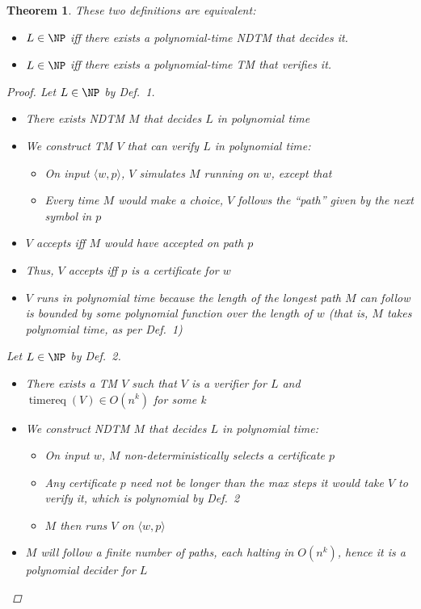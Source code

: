 \documentclass[a4paper]{report}
\newtheorem{theo}{Theorem}
\theoremstyle{definition}
\DeclareMathOperator*{\treq}{timereq}
\begin{document}
\begin{theo} These two definitions are equivalent:
\begin{itemize}
\item[Def.~1:] $L \in \NP$ iff there exists a polynomial-time NDTM that decides it.
\item[Def.~2:] $L \in \NP$ iff there exists a polynomial-time TM that verifies it.
\end{itemize}
\begin{proof}
Let $L \in \NP$ by Def.~1.
\begin{itemize}
\item There exists NDTM $M$ that decides $L$ in polynomial time
\item We construct TM $V$ that can verify $L$ in polynomial time:
\begin{itemize}
\item On input $\langle w, p \rangle$, $V$ simulates $M$ running on $w$, except that
\item Every time $M$ would make a choice, $V$ follows the ``path'' given by the next symbol in $p$
\end{itemize}
\item $V$ accepts iff $M$ would have accepted on path $p$
\item Thus, $V$ accepts iff $p$ is a certificate for $w$
\item $V$ runs in polynomial time because the length of the longest path $M$ can follow is bounded by some polynomial function over the length of $w$ (that is, $M$ takes polynomial time, as per Def.~1)
\end{itemize}

Let $L \in \NP$ by Def.~2.
\begin{itemize}
\item There exists a TM $V$ such that $V$ is a verifier for $L$ and $\treq(V) \in O(n^k)$ for some k
\item We construct NDTM $M$ that decides $L$ in polynomial time:
\begin{itemize}
\item On input $w$, $M$ non-deterministically selects a certificate $p$
\item Any certificate $p$ need not be longer than the max steps it would take $V$ to verify it, which is polynomial by Def.~2
\item $M$ then runs $V$ on $\langle w, p \rangle$
\end{itemize}
\item $M$ will follow a finite number of paths, each halting in $O(n^k)$, hence it is a polynomial decider for $L$
\end{itemize}
\end{proof}
\end{theo}
\end{document}
